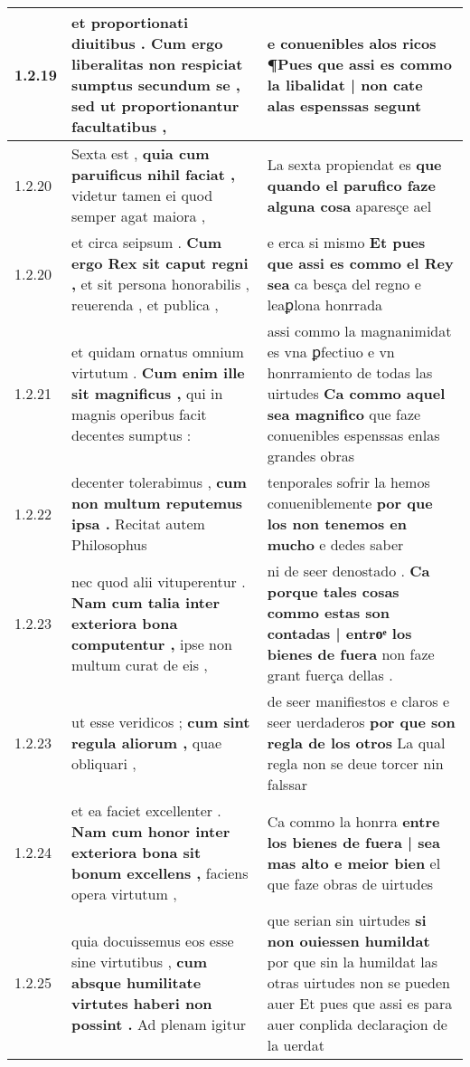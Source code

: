 \begin{tabular}{|p{1cm}|p{6.5cm}|p{6.5cm}|}
1.2.19 & et proportionati diuitibus . \textbf{ Cum ergo liberalitas non respiciat sumptus secundum se , } sed ut proportionantur facultatibus , & e conuenibles alos ricos \textbf{ ¶Pues que assi es commo la libalidat | non cate alas espenssas } segunt \\\hline
1.2.20 & Sexta est , \textbf{ quia cum paruificus nihil faciat , } videtur tamen ei quod semper agat maiora , & La sexta propiendat es \textbf{ que quando el parufico faze alguna cosa } aparesçe ael \\\hline
1.2.20 & et circa seipsum . \textbf{ Cum ergo Rex sit caput regni , } et sit persona honorabilis , reuerenda , et publica , & e erca si mismo \textbf{ Et pues que assi es commo el Rey sea } ca besça del regno e leaꝑlona honrrada \\\hline
1.2.21 & et quidam ornatus omnium virtutum . \textbf{ Cum enim ille sit magnificus , } qui in magnis operibus facit decentes sumptus : & assi commo la magnanimidat es vna ꝑfectiuo e vn honrramiento de todas las uirtudes \textbf{ Ca commo aquel sea magnifico } que faze conuenibles espenssas enlas grandes obras \\\hline
1.2.22 & decenter tolerabimus , \textbf{ cum non multum reputemus ipsa . } Recitat autem Philosophus & tenporales sofrir la hemos conueniblemente \textbf{ por que los non tenemos en mucho } e dedes saber \\\hline
1.2.23 & nec quod alii vituperentur . \textbf{ Nam cum talia inter exteriora bona computentur , } ipse non multum curat de eis , & ni de seer denostado . \textbf{ Ca porque tales cosas commo estas son contadas | entroͤ los bienes de fuera } non faze grant fuerça dellas . \\\hline
1.2.23 & ut esse veridicos ; \textbf{ cum sint regula aliorum , } quae obliquari , & de seer manifiestos e claros e seer uerdaderos \textbf{ por que son regla de los otros } La qual regla non se deue torcer nin falssar \\\hline
1.2.24 & et ea faciet excellenter . \textbf{ Nam cum honor inter exteriora bona sit bonum excellens , } faciens opera virtutum , & Ca commo la honrra \textbf{ entre los bienes de fuera | sea mas alto e meior bien } el que faze obras de uirtudes \\\hline
1.2.25 & quia docuissemus eos esse sine virtutibus , \textbf{ cum absque humilitate virtutes haberi non possint . } Ad plenam igitur & que serian sin uirtudes \textbf{ si non ouiessen humildat } por que sin la humildat las otras uirtudes non se pueden auer Et pues que assi es para auer conplida declaraçion de la uerdat \\\hline

\end{tabular}
